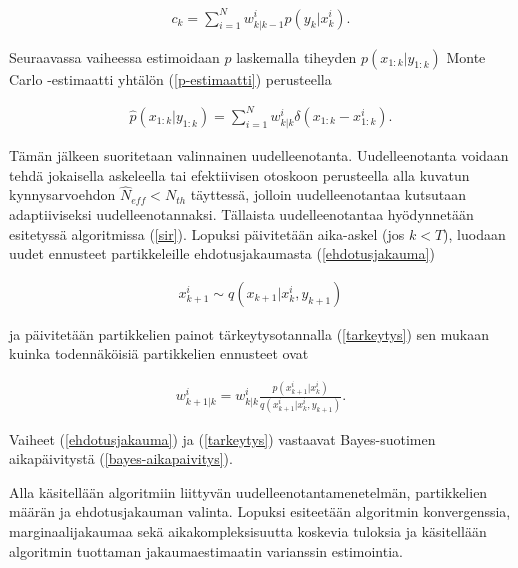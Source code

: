 \documentclass[
  12pt,
  a4paper, twoside]{book}
\begin{document}
\begin{align}\label{normalisointi}
c_k=\sum_{i=1}^{N}w_{k|{k-1}}^ip(y_k|x_k^i).
\end{align}

\noindent Seuraavassa vaiheessa estimoidaan \(p\) laskemalla tiheyden \(p(x_{1:k}|y_{1:k})\) Monte Carlo -estimaatti yhtälön (\ref{p-estimaatti}) perusteella

\begin{align}\label{p-estimaatti}
\hat{p}(x_{1:k}|y_{1:k})=\sum_{i=1}^{N}w_{k|k}^i \delta(x_{1:k}-x_{1:k}^i).
\end{align}

Tämän jälkeen suoritetaan valinnainen uudelleenotanta. Uudelleenotanta voidaan tehdä jokaisella askeleella tai efektiivisen otoskoon perusteella alla kuvatun kynnysarvoehdon \(\hat{N}_{eff}< N_{th}\) täyttessä, jolloin uudelleenotantaa kutsutaan adaptiiviseksi uudelleenotannaksi. Tällaista uudelleenotantaa hyödynnetään esitetyssä algoritmissa (\ref{sir}). Lopuksi päivitetään aika-askel (jos \(k < T\)), luodaan uudet ennusteet partikkeleille ehdotusjakaumasta (\ref{ehdotusjakauma})

\begin{align}\label{ehdotusjakauma}
x_{k+1}^i\sim q(x_{k+1}|x_k^i,y_{k+1})
\end{align}

\noindent ja päivitetään partikkelien painot tärkeytysotannalla (\ref{tarkeytys}) sen mukaan kuinka todennäköisiä partikkelien ennusteet ovat

\begin{align}\label{tarkeytys} w_{k+1|k}^i=w_{k|k}^i\frac{p(x_{k+1}^i|x_k^i)}{q(x_{k+1}^i|x_k^i,y_{k+1})}.
\end{align}

\noindent Vaiheet (\ref{ehdotusjakauma}) ja (\ref{tarkeytys}) vastaavat Bayes-suotimen aikapäivitystä (\ref{bayes-aikapaivitys}).

Alla käsitellään algoritmiin liittyvän uudelleenotantamenetelmän, partikkelien määrän ja ehdotusjakauman valinta. Lopuksi esiteetään algoritmin konvergenssia, marginaalijakaumaa sekä aikakompleksisuutta koskevia tuloksia ja käsitellään algoritmin tuottaman jakaumaestimaatin varianssin estimointia.
\end{document}
